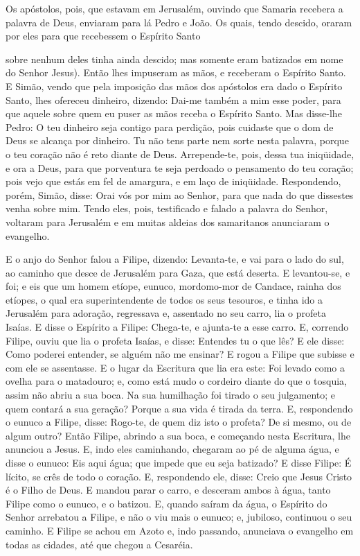Os apóstolos, pois, que estavam em Jerusalém, ouvindo que Samaria
recebera a palavra de Deus, enviaram para lá Pedro e João. Os
quais, tendo descido, oraram por eles para que recebessem o Espírito
Santo

sobre nenhum deles tinha ainda descido; mas somente eram
batizados em nome do Senhor Jesus). Então lhes impuseram as
mãos, e receberam o Espírito Santo. E Simão, vendo que pela
imposição das mãos dos apóstolos era dado o Espírito Santo, lhes
ofereceu dinheiro, dizendo: Dai-me também a mim esse poder,
para que aquele sobre quem eu puser as mãos receba o Espírito Santo.
Mas disse-lhe Pedro: O teu dinheiro seja contigo para
perdição, pois cuidaste que o dom de Deus se alcança por dinheiro.
Tu não tens parte nem sorte nesta palavra, porque o teu
coração não é reto diante de Deus. Arrepende-te, pois, dessa
tua iniqüidade, e ora a Deus, para que porventura te seja perdoado o
pensamento do teu coração; pois vejo que estás em fel de
amargura, e em laço de iniqüidade. Respondendo, porém, Simão,
disse: Orai vós por mim ao Senhor, para que nada do que dissestes
venha sobre mim. Tendo eles, pois, testificado e falado a
palavra do Senhor, voltaram para Jerusalém e em muitas aldeias dos
samaritanos anunciaram o evangelho.

E o anjo do Senhor falou a Filipe, dizendo: Levanta-te, e vai
para o lado do sul, ao caminho que desce de Jerusalém para Gaza, que
está deserta. E levantou-se, e foi; e eis que um homem
etíope, eunuco, mordomo-mor de Candace, rainha dos etíopes, o qual
era superintendente de todos os seus tesouros, e tinha ido a
Jerusalém para adoração, regressava e, assentado no seu
carro, lia o profeta Isaías. E disse o Espírito a Filipe:
Chega-te, e ajunta-te a esse carro. E, correndo Filipe, ouviu
que lia o profeta Isaías, e disse: Entendes tu o que lês? E
ele disse: Como poderei entender, se alguém não me ensinar? E rogou
a Filipe que subisse e com ele se assentasse. E o lugar da
Escritura que lia era este: Foi levado como a ovelha para o
matadouro; e, como está mudo o cordeiro diante do que o tosquia,
assim não abriu a sua boca. Na sua humilhação foi tirado o
seu julgamento; e quem contará a sua geração? Porque a sua vida é
tirada da terra. E, respondendo o eunuco a Filipe, disse:
Rogo-te, de quem diz isto o profeta? De si mesmo, ou de algum outro?
Então Filipe, abrindo a sua boca, e começando nesta
Escritura, lhe anunciou a Jesus. E, indo eles caminhando,
chegaram ao pé de alguma água, e disse o eunuco: Eis aqui água; que
impede que eu seja batizado? E disse Filipe: É lícito, se
crês de todo o coração. E, respondendo ele, disse: Creio que Jesus
Cristo é o Filho de Deus. E mandou parar o carro, e desceram
ambos à água, tanto Filipe como o eunuco, e o batizou. E,
quando saíram da água, o Espírito do Senhor arrebatou a Filipe, e
não o viu mais o eunuco; e, jubiloso, continuou o seu caminho.
E Filipe se achou em Azoto e, indo passando, anunciava o
evangelho em todas as cidades, até que chegou a Cesaréia.


